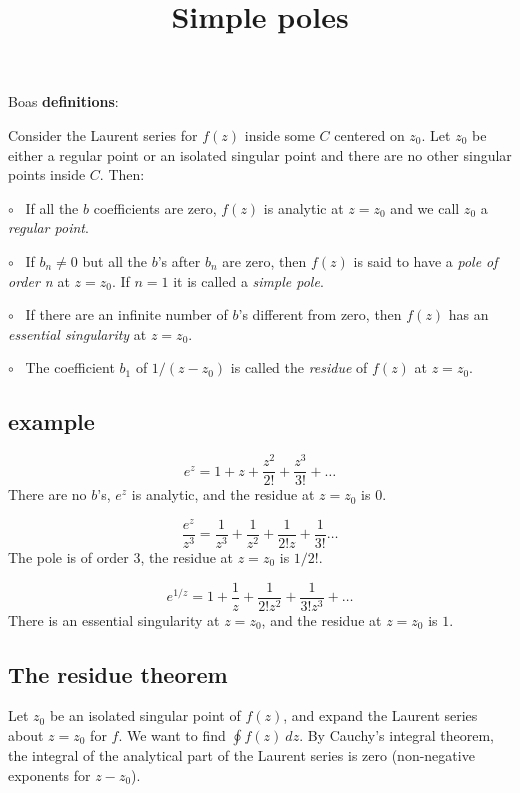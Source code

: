 \documentclass[11pt, oneside]{article}
\title{Simple poles}
\date{}
\begin{document}
\maketitle
\Large


Boas \textbf{definitions}:

Consider the Laurent series for $f(z)$ inside some $C$ centered on $z_0$.  Let $z_0$ be either a regular point or an isolated singular point and there are no other singular points inside $C$.  Then:

$\circ$ \ If all the $b$ coefficients are zero, $f(z)$ is analytic at $z = z_0$ and we call $z_0$ a \emph{regular point}.

$\circ$ \ If $b_n \ne 0$ but all the $b$'s after $b_n$ are zero, then $f(z)$ is said to have a \emph{pole of order n} at $z = z_0$.  If $n=1$ it is called a \emph{simple pole}.

$\circ$ \ If there are an infinite number of $b$'s different from zero, then $f(z)$ has an \emph{essential singularity} at $z = z_0$.

$\circ$ \ The coefficient $b_1$ of $1/(z - z_0)$ is called the \emph{residue} of $f(z)$ at $z = z_0$.

\subsection*{example}

\[ e^z = 1 + z + \frac{z^2}{2!} + \frac{z^3}{3!} + \dots \]
There are no $b$'s, $e^z$ is analytic, and the residue at $z = z_0$ is $0$.

\[ \frac{e^z}{z^3} = \frac{1}{z^3} + \frac{1}{z^2} + \frac{1}{2!z} + \frac{1}{3!} \dots \]
The pole is of order $3$, the residue at $z = z_0$ is $1/2!$.

\[ e^{1/z} = 1 + \frac{1}{z} + \frac{1}{2!z^2} + \frac{1}{3!z^3} + \dots \]
There is an essential singularity at $z = z_0$, and the residue at $z = z_0$ is $1$.

\subsection*{The residue theorem}

Let $z_0$ be an isolated singular point of $f(z)$, and expand the Laurent series about $z = z_0$ for $f$.  We want to find $\oint f(z) \ dz$.  By Cauchy's integral theorem, the integral of the analytical part of the Laurent series is zero (non-negative exponents for $z - z_0$).
\end{document}
